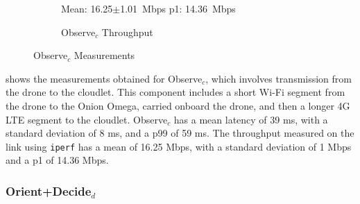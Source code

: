 \begin{figure}[htbp]
\begin{subfigure}[t]{0.45\textwidth}
    \centering
    \small{Mean: 16.25$\pm$1.01~Mbps\; p1: 14.36~Mbps}\\
    \caption{Observe$_{c}$ Throughput}
    \label{fig:observe_c_throughput}
\end{subfigure}
    \caption{Observe$_{c}$ Measurements}
    \label{fig:observe_c_measurements}
\end{figure}

 shows the measurements obtained for
Observe$_c$, which involves transmission from the drone to the cloudlet. This
component includes a short Wi-Fi segment from the drone to the Onion Omega,
carried onboard the drone, and then a longer 4G LTE segment to the cloudlet.
Observe$_c$ has a mean latency of 39 ms, with a standard deviation of 8 ms, and
a p99 of 59 ms. The throughput measured on the link using \texttt{iperf} has a
mean of 16.25 Mbps, with a standard deviation of 1 Mbps and a p1 of 14.36 Mbps.

\subsubsection{Orient+Decide$_d$}
\label{sec:onion-orient-decide-d}

